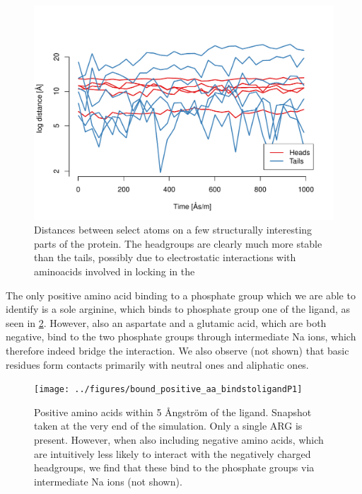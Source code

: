 \documentclass[10pt]{article}\usepackage[]{graphicx}\usepackage[]{color}
\makeatletter
\def\maxwidth{ %
  \ifdim\Gin@nat@width>\linewidth
    \linewidth
  \else
    \Gin@nat@width
  \fi
}
\theoremstyle{plain}
\makeatother
\begin{document}
\begin{multicols*}{2}
\begin{Schunk}
\begin{figure}[H]

{\centering \includegraphics[width=\maxwidth]{figure/twocolumn-liganddists-1} 

}

\caption[Distances between select atoms on a few structurally interesting parts of the protein]{Distances between select atoms on a few structurally interesting parts of the protein. The headgroups are clearly much more stable than the tails, possibly due to electrostatic interactions with aminoacids involved in locking in the }\label{fig:liganddists}
\end{figure}
\end{Schunk}

The only positive amino acid binding to a phosphate group which we are able to identify is a sole arginine, which binds to phosphate group one of the ligand, as seen in \cref{fig:phosphatebinding}. However, also an aspartate and a glutamic acid, which are both negative, bind to the two phosphate groups through intermediate Na ions, which therefore indeed bridge the interaction. We also observe (not shown) that basic residues form contacts primarily with neutral ones and aliphatic ones. 

	\begin{figure}[H]
		\centering
		\texttt{[image: ../figures/bound\_positive\_aa\_bindstoligandP1]}
		\caption{Positive amino acids within 5 Ångström of the ligand. Snapshot taken at the very end of the simulation. Only a single ARG is present. However, when also including negative amino acids, which are intuitively less likely to interact with the negatively charged headgroups, we find that these bind to the phosphate groups via intermediate Na ions (not shown).}
		\label{fig:phosphatebinding}
	\end{figure}  
	

\end{multicols*}
\end{document}

